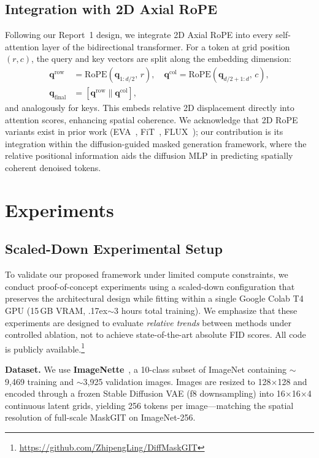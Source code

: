 \documentclass[conference]{IEEEtran}
\begin{document}
\subsection{Integration with 2D Axial RoPE}

Following our Report~1 design, we integrate 2D Axial RoPE into every self-attention layer of the bidirectional transformer. For a token at grid position $(r, c)$, the query and key vectors are split along the embedding dimension:
\begin{align}
\mathbf{q}^{\text{row}} &= \text{RoPE}(\mathbf{q}_{1:d/2},\, r), \quad \mathbf{q}^{\text{col}} = \text{RoPE}(\mathbf{q}_{d/2+1:d},\, c), \\
\mathbf{q}_{\text{final}} &= [\mathbf{q}^{\text{row}} \| \mathbf{q}^{\text{col}}],
\end{align}
and analogously for keys. This embeds relative 2D displacement directly into attention scores, enhancing spatial coherence. We acknowledge that 2D RoPE variants exist in prior work (EVA~\cite{fang2023eva}, FiT~\cite{lu2024fit}, FLUX~\cite{flux2024}); our contribution is its integration within the diffusion-guided masked generation framework, where the relative positional information aids the diffusion MLP in predicting spatially coherent denoised tokens.


\section{Experiments}
\label{sec:experiments}

\subsection{Scaled-Down Experimental Setup}

To validate our proposed framework under limited compute constraints, we conduct proof-of-concept experiments using a scaled-down configuration that preserves the architectural design while fitting within a single Google Colab T4 GPU (15\,GB VRAM, \raise.17ex\hbox{$\scriptstyle\sim$}3 hours total training). We emphasize that these experiments are designed to evaluate \emph{relative trends} between methods under controlled ablation, not to achieve state-of-the-art absolute FID scores. All code is publicly available.\footnote{\url{https://github.com/ZhipengLing/DiffMaskGIT}}

\textbf{Dataset.} We use \textbf{ImageNette}~\cite{howard2020fastai}, a 10-class subset of ImageNet containing $\sim$9,469 training and $\sim$3,925 validation images. Images are resized to 128$\times$128 and encoded through a frozen Stable Diffusion VAE (f8 downsampling) into 16$\times$16$\times$4 continuous latent grids, yielding 256 tokens per image---matching the spatial resolution of full-scale MaskGIT on ImageNet-256.
\end{document}
